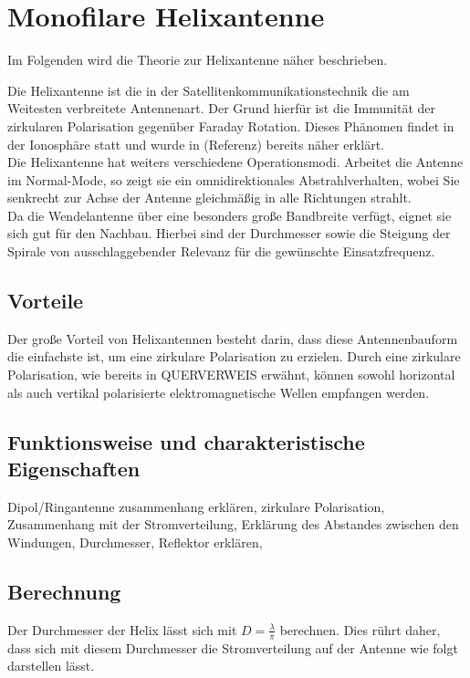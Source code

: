\section{Monofilare Helixantenne}
Im Folgenden wird die Theorie zur Helixantenne näher beschrieben.

Die Helixantenne ist die in der Satellitenkommunikationstechnik die am Weitesten verbreitete Antennenart. Der Grund hierfür ist die Immunität der zirkularen Polarisation gegenüber Faraday Rotation. Dieses Phänomen findet in der Ionosphäre statt und wurde in (Referenz) bereits näher erklärt.\\
\newline
Die Helixantenne hat weiters verschiedene Operationsmodi. Arbeitet die Antenne im Normal-Mode, so zeigt sie ein omnidirektionales Abstrahlverhalten, wobei Sie senkrecht zur Achse der Antenne gleichmäßig in alle Richtungen strahlt.\\
\newline
Da die Wendelantenne über eine besonders große Bandbreite verfügt, eignet sie sich gut für den Nachbau. Hierbei sind der Durchmesser sowie die Steigung der Spirale von ausschlaggebender Relevanz für die gewünschte Einsatzfrequenz. \cite{Amrhein2019}
\cite{Baird2012VisualEnvironments}


\subsection{Vorteile}
Der große Vorteil von Helixantennen besteht darin, dass diese Antennenbauform die einfachste ist, um eine zirkulare Polarisation zu erzielen. Durch eine zirkulare Polarisation, wie bereits in QUERVERWEIS erwähnt, können sowohl horizontal als auch vertikal polarisierte elektromagnetische Wellen empfangen werden.

\subsection{Funktionsweise und charakteristische Eigenschaften}
Dipol/Ringantenne zusammenhang erklären, zirkulare Polarisation, Zusammenhang mit der Stromverteilung, Erklärung des Abstandes zwischen den Windungen, Durchmesser, Reflektor erklären,

\subsection{Berechnung}
Der Durchmesser der Helix lässt sich mit $D=\frac{\lambda}{\pi}$ berechnen. Dies rührt daher, dass sich mit diesem Durchmesser die Stromverteilung auf der Antenne wie folgt darstellen lässt.